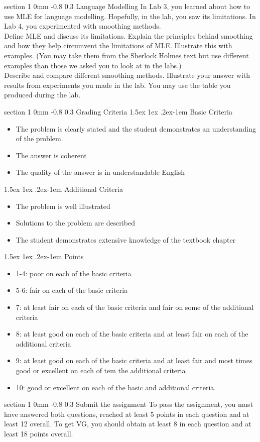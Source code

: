 \documentclass[11pt]{article}
\makeatletter
\newenvironment{titlemize}[1]{%
    \paragraph{#1}
    \begin{itemize}
        \setlength\itemsep{0pt}}
    {\end{itemize}}
\renewcommand{\section}{\@startsection
{section}%
{1}%
{0mm}%
{-0.8\baselineskip}%
{0.3\baselineskip}%
{\bfseries\large}}%
\renewcommand{\paragraph}{%
  \@startsection{paragraph}{4}%
  {\z@}{1.5ex \@plus 1ex \@minus .2ex}{-1em}%
  {\normalfont\normalsize\bfseries}%
}\makeatother
\makeatother
\begin{document}
\section{Language Modelling}
\indent In Lab 3, you learned about how to use MLE for language modelling.
Hopefully, in the lab, you saw its limitations. 
In Lab 4, you experimented with smoothing methods.\\
\indent Define MLE and discuss its limitations. Explain the principles behind
smoothing and how they help circumvent the limitations of MLE. Illustrate this
with examples. (You may take them from the Sherlock Holmes text but use
different examples than those we asked you to look at in the labs.)\\
\indent Describe and compare different smoothing methods.  Illustrate your
answer with results from experiments you made in the lab. You may use the table
you produced during the lab.

\section{Grading Criteria}
\begin{titlemize}{Basic Criteria}
    \item The problem is clearly stated and the student demonstrates an
        understanding of the problem.
    \item The answer is coherent
    \item The quality of the answer is in understandable English
\end{titlemize}
\begin{titlemize}{Additional Criteria}
    \item The problem is well illustrated
    \item Solutions to the problem are described
    \item The student demonstrates extensive knowledge of the textbook chapter
\end{titlemize}

\begin{titlemize}{Points}
    \item 1-4: poor on each of the basic criteria
    \item 5-6: fair on each of the basic criteria
    \item 7: at least fair on each of the basic criteria and fair on some of
        the additional criteria
    \item 8: at least good on each of the basic criteria and at least fair on
        each of the additional criteria
    \item 9: at least good on each of the basic criteria and at least fair and
        most times good or excellent on each of tem the additional criteria
    \item 10: good or excellent on each of the basic and additional criteria.
\end{titlemize}

\section{Submit the assignment}
To pass the assignment, you must have answered both questions, reached at least
5 points in each question and at least 12 overall.
To get VG, you should obtain at least 8 in each question and at least 18 points
overall.
\end{document}
